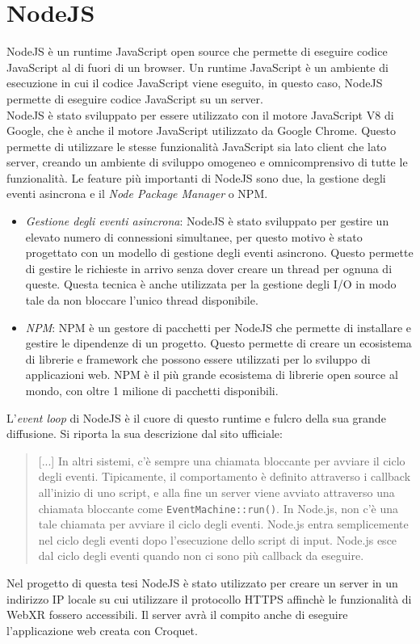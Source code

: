 \section{NodeJS}\label{sec:NodeJS}
NodeJS è un runtime JavaScript open source che permette di eseguire codice JavaScript al di fuori di un browser\cite{NodeJS}. Un runtime JavaScript è un ambiente di esecuzione
in cui il codice JavaScript viene eseguito, in questo caso, NodeJS permette di eseguire codice JavaScript su un server.\\
NodeJS è stato sviluppato per essere utilizzato con il motore JavaScript V8 di Google, che è anche il motore JavaScript utilizzato da Google Chrome. Questo permette di utilizzare
le stesse funzionalità JavaScript sia lato client che lato server, creando un ambiente di sviluppo omogeneo e omnicomprensivo di tutte le funzionalità. Le feature più importanti
di NodeJS sono due, la gestione degli eventi asincrona e il \textit{Node Package Manager} o NPM.
\begin{itemize}
    \item \textit{Gestione degli eventi asincrona}: NodeJS è stato sviluppato per gestire un elevato numero di connessioni simultanee, per questo motivo è stato progettato con un
    modello di gestione degli eventi asincrono. Questo permette di gestire le richieste in arrivo senza dover creare un thread per ognuna di queste.
    Questa tecnica è anche utilizzata per la gestione degli I/O in modo tale da non bloccare l'unico thread disponibile.
    \item \textit{NPM}: NPM è un gestore di pacchetti per NodeJS che permette di installare e gestire le dipendenze di un progetto. Questo permette di creare un ecosistema di
    librerie e framework che possono essere utilizzati per lo sviluppo di applicazioni web. NPM è il più grande ecosistema di librerie open source al mondo, con oltre 1 milione
    di pacchetti disponibili.
\end{itemize}
L'\textit{event loop} di NodeJS è il cuore di questo runtime e fulcro della sua grande diffusione. Si riporta la sua descrizione dal sito ufficiale\cite{NodeJS}:
\begin{quote}
    [...] In altri sistemi, c'è sempre una chiamata bloccante per avviare il ciclo degli eventi. Tipicamente, il comportamento è definito attraverso i callback all'inizio di uno script, 
    e alla fine un server viene avviato attraverso una chiamata bloccante come \texttt{EventMachine::run()}. In Node.js, non c'è una tale chiamata per avviare il ciclo degli eventi. Node.js 
    entra semplicemente nel ciclo degli eventi dopo l'esecuzione dello script di input. Node.js esce dal ciclo degli eventi quando non ci sono più callback da eseguire.
\end{quote}
Nel progetto di questa tesi NodeJS è stato utilizzato per creare un server in un indirizzo IP locale su cui utilizzare il protocollo HTTPS affinchè le funzionalità di WebXR fossero
accessibili. Il server avrà il compito anche di eseguire l'applicazione web creata con Croquet.

